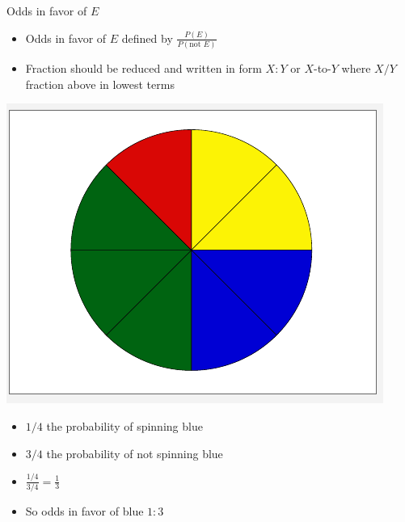 \documentclass[handout]{beamer}
\theoremstyle{definition}
\begin{document}
\begin{frame}{Odds in favor of $E$}
\begin{definition}
\begin{itemize}
\item \alert{Odds in favor of $E$} defined by
$\frac{P\left(E\right)}{P\left(\text{not $E$}\right)}$
\item Fraction should be reduced and written
in form \alert{$X:Y$} or \alert{$X$-to-$Y$}
where $X/Y$ fraction above in lowest terms
\end{itemize}
\end{definition}
\begin{example}
\begin{multicols}{2}
\includegraphics[scale=.30]{Spinner}
\begin{itemize}
\item $1/4$ the probability of spinning blue
\item $3/4$ the probability of \alert{not} spinning blue
\item $\frac{1/4}{3/4}=\frac{1}{3}$
\item So odds in favor of blue $1:3$
\end{itemize}
\end{multicols}
\end{example}
\end{frame}
\end{document}
